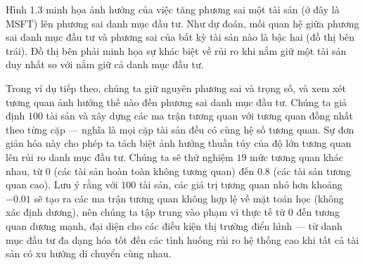 Hình 1.3 minh họa ảnh hưởng của việc tăng phương sai một tài sản (ở đây là MSFT) lên phương sai danh mục đầu tư. Như dự đoán, mối quan hệ giữa phương sai danh mục đầu tư và phương sai của bất kỳ tài sản nào là bậc hai (đồ thị bên trái). Đồ thị bên phải minh họa sự khác biệt về rủi ro khi nắm giữ một tài sản duy nhất so với nắm giữ cả danh mục đầu tư.

Trong ví dụ tiếp theo, chúng ta giữ nguyên phương sai và trọng số, và xem xét tương quan ảnh hưởng thế nào đến phương sai danh mục đầu tư. Chúng ta giả định $100$ tài sản và xây dựng các ma trận tương quan với tương quan đồng nhất theo từng cặp — nghĩa là mọi cặp tài sản đều có cùng hệ số tương quan. Sự đơn giản hóa này cho phép ta tách biệt ảnh hưởng thuần túy của độ lớn tương quan lên rủi ro danh mục đầu tư. Chúng ta sẽ thử nghiệm $19$ mức tương quan khác nhau, từ $0$ (các tài sản hoàn toàn không tương quan) đến $0.8$ (các tài sản tương quan cao). Lưu ý rằng với $100$ tài sản, các giá trị tương quan nhỏ hơn khoảng $-0.01$ sẽ tạo ra các ma trận tương quan không hợp lệ về mặt toán học (không xác định dương), nên chúng ta tập trung vào phạm vi thực tế từ 0 đến tương quan dương mạnh, đại diện cho các điều kiện thị trường điển hình — từ danh mục đầu tư đa dạng hóa tốt đến các tình huống rủi ro hệ thống cao khi tất cả tài sản có xu hướng di chuyển cùng nhau.

